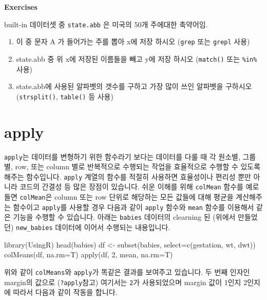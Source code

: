 \documentclass[
]{book}
\newenvironment{Shaded}{\begin{snugshade}}{\end{snugshade}}
\newcommand{\AttributeTok}[1]{\textcolor[rgb]{0.77,0.63,0.00}{#1}}
\newcommand{\DecValTok}[1]{\textcolor[rgb]{0.00,0.00,0.81}{#1}}
\newcommand{\FunctionTok}[1]{\textcolor[rgb]{0.00,0.00,0.00}{#1}}
\newcommand{\NormalTok}[1]{#1}
\newcommand{\OtherTok}[1]{\textcolor[rgb]{0.56,0.35,0.01}{#1}}
\begin{document}
\textbf{Exercises}

built-in 데이터셋 중 \texttt{state.abb} 은 미국의 50개 주에대한 축약어임.

\begin{enumerate}
\def\labelenumi{\arabic{enumi})}
\item
  이 중 문자 A 가 들어가는 주를 뽑아 x에 저장 하시오 (\texttt{grep} 또는 \texttt{grepl} 사용)
\item
  state.abb 중 위 x에 저장된 이름들을 빼고 y에 저장 하시오 (\texttt{match()} 또는 \texttt{\%in\%}사용)
\item
  state.abb에 사용된 알파벳의 갯수를 구하고 가장 많이 쓰인 알파벳을 구하시오 (\texttt{strsplit()}, \texttt{table()} 등 사용)
\end{enumerate}

\hypertarget{apply}{%
\section{apply}\label{apply}}

\texttt{apply}는 데이터를 변형하기 위한 함수라기 보다는 데이터를 다룰 때 각 원소별, 그룹별, row, 또는 column 별로 반복적으로 수행되는 작업을 효율적으로 수행할 수 있도록 해주는 함수입니다. \texttt{apply} 계열의 함수를 적절히 사용하면 효율성이나 편리성 뿐만 아니라 코드의 간결성 등 많은 장점이 있습니다. 쉬운 이해를 위해 \texttt{colMean} 함수를 예로 들면 \texttt{colMean}은 column 또는 row 단위로 해당하는 모든 값들에 대해 평균을 계산해주는 함수이고 \texttt{apply}를 사용할 경우 다음과 같이 \texttt{apply} 함수와 \texttt{mean} 함수를 이용해서 같은 기능을 수행할 수 있습니다. 아래는 \texttt{babies} 데이터의 clearning 된 (위에서 만들었던) \texttt{new\_babies} 데이터에 이어서 수행되는 내용입니다.

\begin{Shaded}
\begin{Highlighting}[]
\FunctionTok{library}\NormalTok{(UsingR)}
\FunctionTok{head}\NormalTok{(babies)}
\NormalTok{df }\OtherTok{\textless{}{-}} \FunctionTok{subset}\NormalTok{(babies, }\AttributeTok{select=}\FunctionTok{c}\NormalTok{(gestation, wt, dwt))}
\FunctionTok{colMeans}\NormalTok{(df, }\AttributeTok{na.rm=}\NormalTok{T)}
\FunctionTok{apply}\NormalTok{(df, }\DecValTok{2}\NormalTok{, mean, }\AttributeTok{na.rm=}\NormalTok{T)}
\end{Highlighting}
\end{Shaded}

위와 같이 \texttt{colMeans}와 \texttt{apply}가 똑같은 결과를 보여주고 있습니다. 두 번째 인자인 margin의 값으로 (\texttt{?apply}참고) 여기서는 \texttt{2}가 사용되었으며 margin 값이 1인지 2인지에 따라서 다음과 같이 작동을 합니다.
\end{document}
